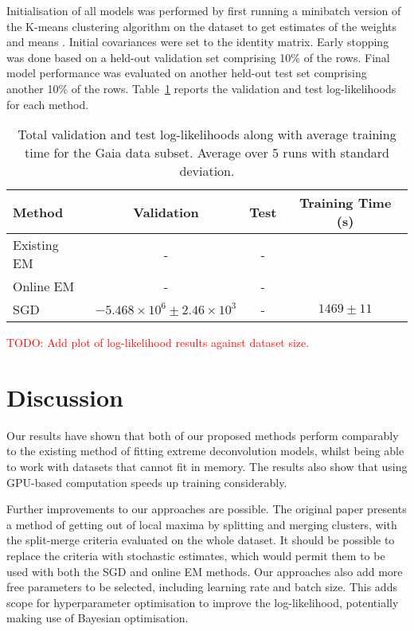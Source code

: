 \documentclass{article}
\newcommand{\todo}[1]{\textcolor{red}{TODO: #1}}
\begin{document}
Initialisation of all models was performed by first running a minibatch version of the K-means clustering algorithm on the dataset to get estimates of the weights and means \cite{sculleyWebscaleKmeansClustering2010}.
Initial covariances were set to the identity matrix.
Early stopping was done based on a held-out validation set comprising 10\% of the rows.
Final model performance was evaluated on another held-out test set comprising another 10\% of the rows.
Table~\ref{results-table} reports the validation and test log-likelihoods for each method.

\begin{table}
  \caption{Total validation and test log-likelihoods along with average training time for the Gaia data subset. Average over 5 runs with standard deviation.}
  \label{results-table}
  \centering
  \begin{tabular}{lccc}
    \toprule
    Method     & Validation     & Test & Training Time (s) \\
    \midrule
    Existing EM & -  & -     \\
    Online EM     & - & -      \\
    SGD     & $-5.468 \times 10^6 \pm 2.46 \times 10^3$        & - & $1469 \pm 11$ \\
    \bottomrule
  \end{tabular}
\end{table}

\todo{Add plot of log-likelihood results against dataset size.}

\section{Discussion}

Our results have shown that both of our proposed methods perform comparably to the existing method of fitting extreme deconvolution models, whilst being able to work with datasets that cannot fit in memory.
The results also show that using GPU-based computation speeds up training considerably.

Further improvements to our approaches are possible.
The original paper presents a method of getting out of local maxima by splitting and merging clusters, with the split-merge criteria evaluated on the whole dataset.
It should be possible to replace the criteria with stochastic estimates, which would permit them to be used with both the SGD and online EM methods.
Our approaches also add more free parameters to be selected, including learning rate and batch size.
This adds scope for hyperparameter optimisation to improve the log-likelihood, potentially making use of Bayesian optimisation.
\end{document}
